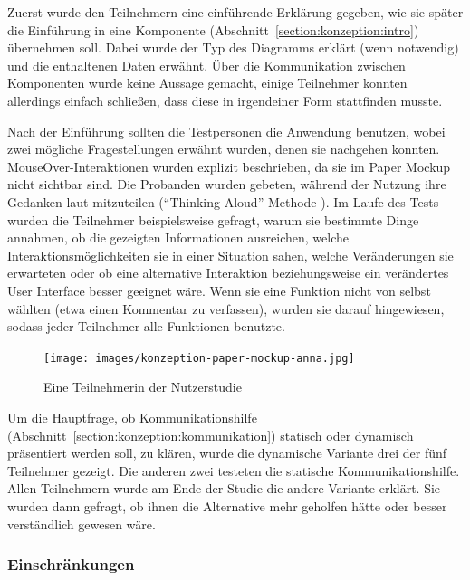 \documentclass[
	headsepline,
	footsepline,
	fontsize=12pt,
	bibliography=totoc
]{scrbook}
\begin{document}
Zuerst wurde den Teilnehmern eine einführende Erklärung gegeben, wie sie später die Einführung in eine Komponente (Abschnitt~\ref{section:konzeption:intro}) übernehmen soll. Dabei wurde der Typ des Diagramms erklärt (wenn notwendig) und die enthaltenen Daten erwähnt. Über die Kommunikation zwischen Komponenten wurde keine Aussage gemacht, einige Teilnehmer konnten allerdings einfach schließen, dass diese in irgendeiner Form stattfinden musste. 


Nach der Einführung sollten die Testpersonen die Anwendung benutzen, wobei zwei mögliche Fragestellungen erwähnt wurden, denen sie nachgehen konnten. MouseOver-Interaktionen wurden explizit beschrieben, da sie im Paper Mockup nicht sichtbar sind. Die Probanden wurden gebeten, während der Nutzung ihre Gedanken laut mitzuteilen (\enquote{Thinking Aloud} Methode \cite{vanSomeren1994}). Im Laufe des Tests wurden die Teilnehmer beispielsweise gefragt, warum sie bestimmte Dinge annahmen, ob die gezeigten Informationen ausreichen, welche Interaktionsmöglichkeiten sie in einer Situation sahen, welche Veränderungen sie erwarteten oder ob eine alternative Interaktion beziehungsweise ein verändertes User Interface besser geeignet wäre. Wenn sie eine Funktion nicht von selbst wählten (etwa einen Kommentar zu verfassen), wurden sie darauf hingewiesen, sodass jeder Teilnehmer alle Funktionen benutzte.

\begin{figure}[htbp]
   \centering
   \texttt{[image: images/konzeption-paper-mockup-anna.jpg]}
   \caption{Eine Teilnehmerin der Nutzerstudie}
   \label{figure:paper-mockup-anna}
\end{figure}

Um die Hauptfrage, ob Kommunikationshilfe (Abschnitt~\ref{section:konzeption:kommunikation}) statisch oder dynamisch präsentiert werden soll, zu klären, wurde die dynamische Variante drei der fünf Teilnehmer gezeigt. Die anderen zwei testeten die statische Kommunikationshilfe. Allen Teilnehmern wurde am Ende der Studie die andere Variante erklärt. Sie wurden dann gefragt, ob ihnen die Alternative mehr geholfen hätte oder besser verständlich gewesen wäre.

\subsubsection{Einschränkungen}

\end{document}
